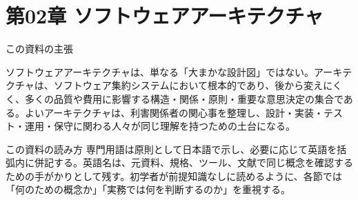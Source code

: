 \section{第02章 ソフトウェアアーキテクチャ}
\noindent この資料の主張\par
ソフトウェアアーキテクチャは、単なる「大まかな設計図」ではない。アーキテクチャは、ソフトウェア集約システムにおいて根本的であり、後から変えにくく、多くの品質や費用に影響する構造・関係・原則・重要な意思決定の集合である。よいアーキテクチャは、利害関係者の関心事を整理し、設計・実装・テスト・運用・保守に関わる人々が同じ理解を持つための土台になる。

\begin{statementbox}{この資料の読み方}
専門用語は原則として日本語で示し、必要に応じて英語を括弧内に併記する。英語名は、元資料、規格、ツール、文献で同じ概念を確認するための手がかりとして残す。初学者が前提知識なしに読めるように、各節では「何のための概念か」「実務では何を判断するのか」を重視する。
\end{statementbox}
